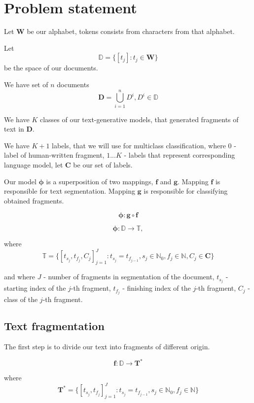\documentclass{article}
\begin{document}
\section{Problem statement}

Let $\mathbf{W}$ be our alphabet, tokens consists from characters from that alphabet.

Let $$\mathbb{D} = \{[t_j] : t_j \in \mathbf{W}\}$$ be the space of our documents.

We have set of $n$ documents
$$\mathbf{D} = \bigcup_{i=1}^{n}D^i, D^i \in \mathbb{D}$$

We have $K$ classes of our text-generative models, that generated fragments of text in $\mathbf{D}$.

We have $K + 1$ labels, that we will use for multiclass classification, where $0$ - label of human-written fragment, ${1...K}$ - labels that represent corresponding language model, let $\mathbf{C}$ be our set of labels.

Our model $\mathbf{\phi}$ is a superposition of two mappings, $\mathbf{f}$ and $\mathbf{g}$. Mapping $\mathbf{f}$ is responsible for text segmentation. Mapping $\mathbf{g}$ is responsible for classifying obtained fragments.

$$\mathbf{\phi} : \mathbf{g} \circ \mathbf{f}$$


$$\mathbf{\phi}: \mathbb{D} \rightarrow \mathbb{T},$$

where $$\mathbb{T} = \{[t_{s_j}, t_{f_j}, C_j]_{j = 1}^{J} : t_{s_j} = t_{f_{j - 1}}, s_j \in \mathbb{N}_0, f_j \in \mathbb{N}, C_j \in \mathbf{C}\}$$

and where $J$ - number of fragments in segmentation of the document, $t_{s_j}$ - starting index of the $j$-th fragment,  $t_{f_j}$ - finishing index of the $j$-th fragment,  $C_{j}$ - class of the $j$-th fragment.



\subsection{Text fragmentation}
The first step is to divide our text into fragments of different origin.

$$\mathbf{f}: \mathbb{D} \rightarrow \mathbf{T}^*$$

where $$\mathbf{T}^* = \{[t_{s_j}, t_{f_j}]_{j = 1}^{J} : t_{s_j} = t_{f_{j - 1}}, s_j \in \mathbb{N}_0, f_j \in \mathbb{N}\}$$
\end{document}
